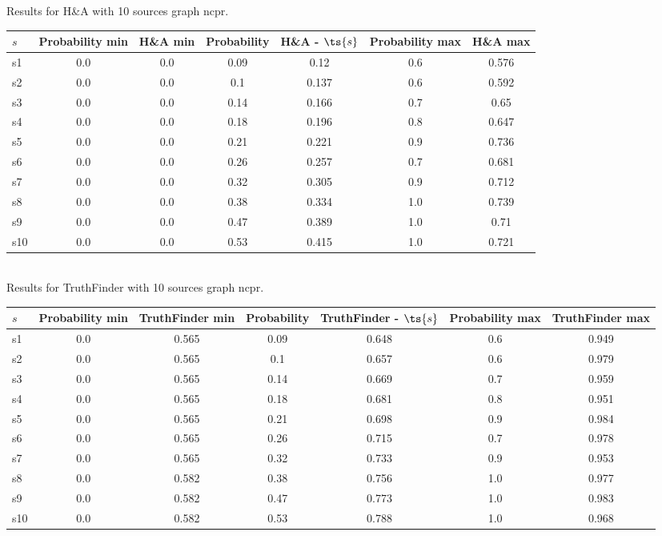 \documentclass{article}
\begin{document}
\noindent Results for H\&A with 10 sources graph ncpr.

\noindent\begin{tabular}{|l|c|c|c|c|c|c|}
\hline
$s$& Probability min & H\&A min & Probability & H\&A - $\ts{s}$ & Probability max & H\&A max\\
\hline
s1 &0.0 & 0.0 & 0.09 & 0.12 & 0.6 & 0.576\\
\hline
s2 &0.0 & 0.0 & 0.1 & 0.137 & 0.6 & 0.592\\
\hline
s3 &0.0 & 0.0 & 0.14 & 0.166 & 0.7 & 0.65\\
\hline
s4 &0.0 & 0.0 & 0.18 & 0.196 & 0.8 & 0.647\\
\hline
s5 &0.0 & 0.0 & 0.21 & 0.221 & 0.9 & 0.736\\
\hline
s6 &0.0 & 0.0 & 0.26 & 0.257 & 0.7 & 0.681\\
\hline
s7 &0.0 & 0.0 & 0.32 & 0.305 & 0.9 & 0.712\\
\hline
s8 &0.0 & 0.0 & 0.38 & 0.334 & 1.0 & 0.739\\
\hline
s9 &0.0 & 0.0 & 0.47 & 0.389 & 1.0 & 0.71\\
\hline
s10 &0.0 & 0.0 & 0.53 & 0.415 & 1.0 & 0.721\\
\hline
\end{tabular}\\

\noindent Results for TruthFinder with 10 sources graph ncpr.

\noindent\begin{tabular}{|l|c|c|c|c|c|c|}
\hline
$s$& Probability min & TruthFinder min & Probability & TruthFinder - $\ts{s}$ & Probability max & TruthFinder max\\
\hline
s1 &0.0 & 0.565 & 0.09 & 0.648 & 0.6 & 0.949\\
\hline
s2 &0.0 & 0.565 & 0.1 & 0.657 & 0.6 & 0.979\\
\hline
s3 &0.0 & 0.565 & 0.14 & 0.669 & 0.7 & 0.959\\
\hline
s4 &0.0 & 0.565 & 0.18 & 0.681 & 0.8 & 0.951\\
\hline
s5 &0.0 & 0.565 & 0.21 & 0.698 & 0.9 & 0.984\\
\hline
s6 &0.0 & 0.565 & 0.26 & 0.715 & 0.7 & 0.978\\
\hline
s7 &0.0 & 0.565 & 0.32 & 0.733 & 0.9 & 0.953\\
\hline
s8 &0.0 & 0.582 & 0.38 & 0.756 & 1.0 & 0.977\\
\hline
s9 &0.0 & 0.582 & 0.47 & 0.773 & 1.0 & 0.983\\
\hline
s10 &0.0 & 0.582 & 0.53 & 0.788 & 1.0 & 0.968\\
\hline
\end{tabular}\\
\end{document}

